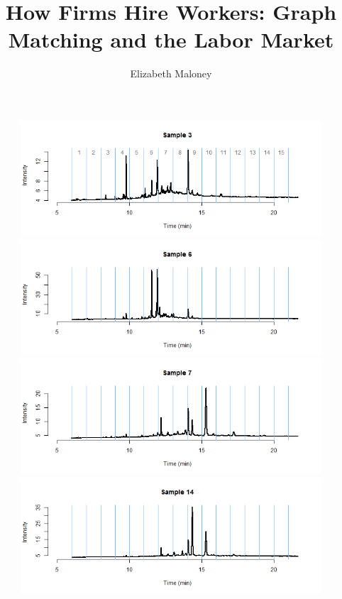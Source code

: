 \documentclass[11pt]{article}
\theoremstyle{plain}
\theoremstyle{definition}
\begin{document}
 

\title{How Firms Hire Workers: Graph Matching and the Labor Market}
\author{Elizabeth Maloney}
\begin{figure}[H]
\begin{center}
\includegraphics[trim ={3.5cm 2.7cm 2cm 2cm},scale=.6, clip=true]{BinPlotDMC_1.png}
\includegraphics[trim ={3.5cm 2.7cm 2cm 2cm},scale=.6, clip=true]{BinPlotDMC_2.png}
\includegraphics[trim ={3.5cm 2.7cm 2cm 2cm},scale=.6, clip=true]{BinPlotDMC_3.png}
\includegraphics[trim ={3.5cm 2.7cm 2cm 2cm},scale=.6, clip=true]{BinPlotDMC_4.png}

\end{center}
\end{figure}
\end{document}
